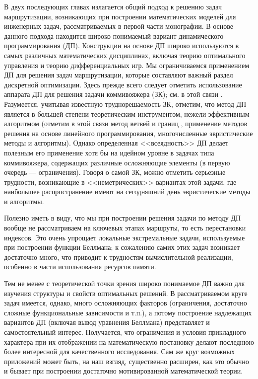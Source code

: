 \documentclass[11pt,twoside,openany]{report}
\begin{document}
В двух последующих главах излагается общий подход к решению задач маршрутизации,
возникающих при построении математических моделей для инженерных задач, рассматриваемых
в первой части монографии. В основе данного подхода находится широко понимаемый вариант
динамического программирования (ДП). Конструкции на основе ДП широко используются в самых
различных математических дисциплинах, включая теорию оптимального управления и теорию
дифференциальных игр. Мы ограничиваемся применением ДП для решения задач маршрутизации,
которые составляют важный раздел дискретной оптимизации. Здесь прежде всего следует отметить
использование аппарата ДП  для решения задачи коммивояжера (ЗК); см. в этой связи
\cite{Cha4`,Cha16`}. Разумеется, учитывая известную труднорешаемость ЗК, отметим, что
метод ДП является в большей степени теоретическим инструментом, нежели эффективным
алгоритмом (отметим в этой связи метод ветвей и границ \cite{Cha17`}, применение
методов решения на основе линейного программирования, многочисленные эвристические
методы и алгоритмы). Однако определенная <<всеядность>> ДП делает полезным его применение
хотя бы на идейном уровне в задачах типа коммивояжера, содержащих различные  осложняющие
элементы (в первую очередь --- ограничения). Говоря о самой ЗК, можно отметить серьезные
трудности, возникающие в <<неметрических>> вариантах этой задачи, где наибольшее
распространение имеют на сегодняшний день эвристические методы и алгоритмы.

Полезно иметь в виду, что мы при построении решения задачи по методу ДП вообще не
рассматриваем на ключевых этапах маршруты, то есть перестановки  индексов. Это очень
упрощает локальные экстремальные задачи, используемые при построении функции Беллмана;
к сожалению самих этих задач возникает достаточно много, что приводит к трудностям
вычислительной реализации, особенно в части использования ресурсов памяти.

Тем не менее с теоретической точки зрения широко понимаемое ДП важно для изучения
структуры и свойств оптимальных решений. В рассматриваемом круге задач имеется, однако,
много осложняющих факторов (ограничения, достаточно сложные функциональные зависимости
и т.п.), а потому построение надлежащих вариантов ДП (включая вывод уравнения Беллмана)
представляет и самостоятельный интерес. Получается, что ограничения и условия прикладного
характера при их отображении на математическую постановку делают последнюю более интересной
для качественного исследования. Сам же круг возможных приложений может быть, на наш взгляд,
существенно расширен, как это обычно и бывает при построении достаточно мотивированной
математической теории.
\end{document}
